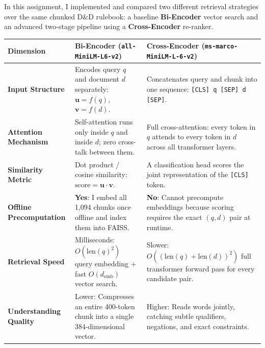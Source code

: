 \documentclass[10pt,a4paper]{article}
\begin{document}
In this assignment, I implemented and compared two different retrieval strategies over the same chunked D\&D rulebook: a baseline \textbf{Bi-Encoder} vector search and an advanced two-stage pipeline using a \textbf{Cross-Encoder} re-ranker.

\vspace{1pt}
\begin{table}[h!]
\centering
\small
\renewcommand{\arraystretch}{1.18}
\begin{tabularx}{\textwidth}{@{} L{3.2cm} Y Y @{}}
\hline
{}
\textbf{Dimension} & \textbf{Bi-Encoder (\texttt{all-MiniLM-L6-v2})} & \textbf{Cross-Encoder (\texttt{ms-marco-MiniLM-L-6-v2})} \\
\hline
\textbf{Input Structure} & 
Encodes query $q$ and document $d$ separately: $\mathbf{u} = f(q)$, $\mathbf{v} = f(d)$. & 
Concatenates query and chunk into one sequence: \texttt{[CLS] q [SEP] d [SEP]}. \\

\textbf{Attention Mechanism} & 
Self-attention runs only inside $q$ and inside $d$; zero cross-talk between them. & 
Full cross-attention: every token in $q$ attends to every token in $d$ across all transformer layers. \\

\textbf{Similarity Metric} & 
Dot product / cosine similarity: $\text{score} = \mathbf{u} \cdot \mathbf{v}$. & 
A classification head scores the joint representation of the \texttt{[CLS]} token. \\

\textbf{Offline Precomputation} & 
\textbf{Yes}: I embed all 1,094 chunks once offline and index them into FAISS. & 
\textbf{No}: Cannot precompute embeddings because scoring requires the exact $(q, d)$ pair at runtime. \\

\textbf{Retrieval Speed} & 
Milliseconds: $O(\text{len}(q)^2)$ query embedding + fast $O(d_{\text{emb}})$ vector search. & 
Slower: $O((\text{len}(q) + \text{len}(d))^2)$ full transformer forward pass for every candidate pair. \\

\textbf{Understanding Quality} & 
Lower: Compresses an entire 400-token chunk into a single 384-dimensional vector. & 
Higher: Reads words jointly, catching subtle qualifiers, negations, and exact constraints. \\
\hline
\end{tabularx}
\end{table}
\end{document}
